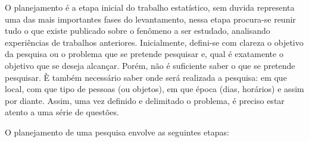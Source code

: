 O planejamento é a etapa inicial do trabalho estatístico, sem duvida representa uma das mais importantes fases do levantamento, nessa etapa procura-se reunir tudo o que existe publicado sobre o fe\-nô\-me\-no a ser estudado, analisando experiências de trabalhos anteriores. Inicialmente, defini-se com clareza o objetivo da pesquisa ou o problema que se pretende pesquisar e, qual é exatamente o objetivo que se deseja alcançar. Porém, não é suficiente saber o que se pretende pesquisar. È também necessário saber onde será realizada a pesquisa: em que local, com que tipo de pessoas (ou objetos), em que época (dias, horários) e assim por diante. Assim, uma vez definido e delimitado o problema, é preciso estar atento a uma série de questões.\vskip0.3cm

\newpage
O planejamento de uma pesquisa envolve as seguintes etapas:


